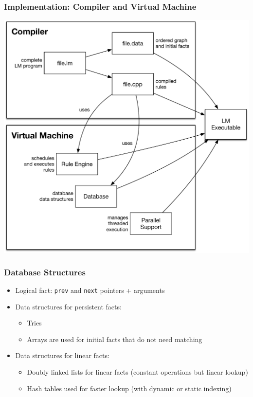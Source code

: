 \documentclass{beamer}
\begin{document}
\begin{frame}[fragile]
   \frametitle{Implementation: Compiler and Virtual Machine}
   \begin{center}
     \includegraphics[width=0.7\linewidth]{figures/overview.pdf}
   \end{center}
\end{frame}

\begin{frame}[fragile]
   \frametitle{Database Structures}
   \begin{itemize}
      \item Logical fact: \texttt{prev} and \texttt{next} pointers + arguments
      \item Data structures for persistent facts:
      \begin{itemize}
         \item Tries
         \item Arrays are used for initial facts that do not need matching
      \end{itemize} 
      \item Data structures for linear facts:
      \begin{itemize}
         \item Doubly linked lists for linear facts (constant operations but linear lookup)
         \item Hash tables used for faster lookup (with dynamic or static indexing)
      \end{itemize}
   \end{itemize}
\end{frame}
\end{document}
